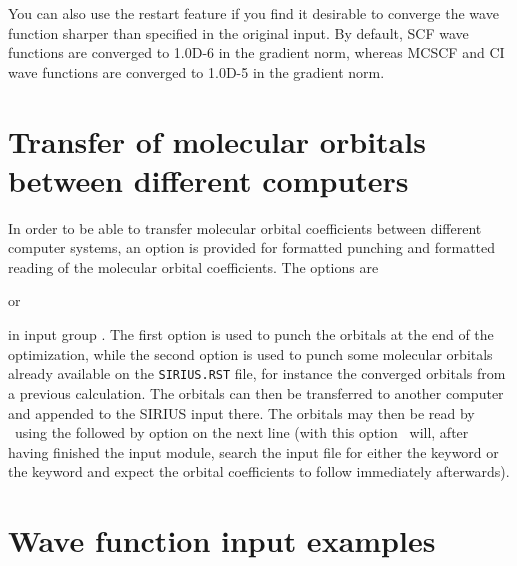 \noindent
You can also use the restart feature if you find it desirable to
converge the wave function sharper
than specified in the original input. By default, SCF wave
functions are converged to 1.0D-6 in the gradient norm, whereas MCSCF
and CI wave functions are converged to 1.0D-5 in the gradient norm. 

\pagebreak[2]
\section{\label{sec:ig_orbtransfer}
Transfer of molecular orbitals between different computers}

In order to be able to transfer molecular orbital coefficients between
different computer systems,
an option is provided for
formatted punching and formatted reading of the molecular orbital
coefficients.  The options are
\begin{center}
    or 
\end{center}
in input group . The first option is used to
punch the orbitals at the end of the optimization, while the
second option is used to punch some molecular
orbitals already available on the \verb|SIRIUS.RST|
file, for instance the converged
orbitals from a previous calculation.  The orbitals can then be
transferred to another computer and appended to the SIRIUS input
there. The orbitals may then be read by \siraba\ using the 
followed by  option on the next line (with this option
\siraba\ will, after having finished the 
input module, search the input file for either the 
keyword or the  keyword and expect the orbital
coefficients to follow immediately afterwards).


\section{\label{examples} Wave function input examples}

